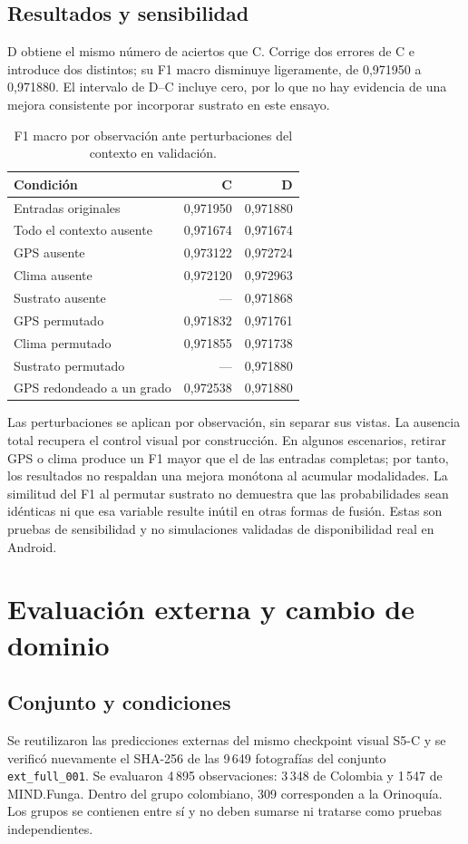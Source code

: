 \documentclass[11pt,a4paper]{article}
\begin{document}
\subsection{Resultados y sensibilidad}
D obtiene el mismo número de aciertos que C. Corrige dos errores de C e
introduce dos distintos; su F1 macro disminuye ligeramente, de 0,971950 a
0,971880. El intervalo de D--C incluye cero, por lo que no hay evidencia de
una mejora consistente por incorporar sustrato en este ensayo.

\begin{table}[H]
\centering
\caption{F1 macro por observación ante perturbaciones del contexto en validación.}
\label{tab:sensitivity}
\begin{tabular}{lrr}
\toprule
Condición & C & D \\
\midrule
Entradas originales & 0,971950 & 0,971880 \\
Todo el contexto ausente & 0,971674 & 0,971674 \\
GPS ausente & 0,973122 & 0,972724 \\
Clima ausente & 0,972120 & 0,972963 \\
Sustrato ausente & --- & 0,971868 \\
GPS permutado & 0,971832 & 0,971761 \\
Clima permutado & 0,971855 & 0,971738 \\
Sustrato permutado & --- & 0,971880 \\
GPS redondeado a un grado & 0,972538 & 0,971880 \\
\bottomrule
\end{tabular}
\end{table}

Las perturbaciones se aplican por observación, sin separar sus vistas. La
ausencia total recupera el control visual por construcción. En algunos
escenarios, retirar GPS o clima produce un F1 mayor que el de las entradas
completas; por tanto, los resultados no respaldan una mejora monótona al
acumular modalidades. La similitud del F1 al permutar sustrato no demuestra
que las probabilidades sean idénticas ni que esa variable resulte inútil en
otras formas de fusión. Estas son pruebas de sensibilidad y no simulaciones
validadas de disponibilidad real en Android.

\section{Evaluación externa y cambio de dominio}
\subsection{Conjunto y condiciones}
Se reutilizaron las predicciones externas del mismo checkpoint visual S5-C y
se verificó nuevamente el SHA-256 de las 9\,649 fotografías del conjunto
\texttt{ext\_full\_001}. Se evaluaron 4\,895 observaciones: 3\,348 de
Colombia y 1\,547 de MIND.Funga. Dentro del grupo colombiano, 309 corresponden
a la Orinoquía. Los grupos se contienen entre sí y no deben sumarse ni tratarse
como pruebas independientes.
\end{document}
